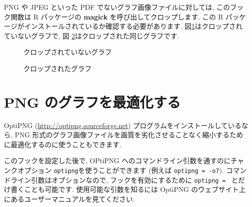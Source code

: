 \documentclass[
  11pt,
]{bxjsreport}
\newenvironment{Shaded}{\begin{snugshade}}{\end{snugshade}}
\newcommand{\AttributeTok}[1]{\textcolor[rgb]{0.77,0.63,0.00}{#1}}
\newcommand{\FunctionTok}[1]{\textcolor[rgb]{0.00,0.00,0.00}{#1}}
\newcommand{\NormalTok}[1]{#1}
\newcommand{\SpecialCharTok}[1]{\textcolor[rgb]{0.00,0.00,0.00}{#1}}
\begin{document}
PNG や JPEG といった PDF でないグラフ画像ファイルに対しては, このフック関数は R パッケージの \textbf{magick} \autocite{R-magick}を呼び出してクロップします. この R パッケージがインストールされているか確認する必要があります. 図\ref{fig:crop-no}はクロップされていないグラフで, 図 \ref{fig:crop-yes}はクロップされた同じグラフです.

\begin{figure}

{\centering {} 

}

\caption{クロップされていないグラフ}\label{fig:crop-no}
\end{figure}

\begin{figure}

{\centering {} 

}

\caption{クロップされたグラフ}\label{fig:crop-yes}
\end{figure}

\hypertarget{optipng}{%
\section{PNG のグラフを最適化する}\label{optipng}}

OptiPNG (\url{http://optipng.sourceforge.net}) プログラムをインストールしているなら, PNG 形式のグラフ画像ファイルを画質を劣化させることなく縮小するために最適化するのに使うこともできます.

\begin{Shaded}
\end{Shaded}

このフックを設定した後で, OPtiPNG へのコマンドライン引数を通すのにチャンクオプション \texttt{optipng}を使うことができます (例えば \texttt{optipng = \textquotesingle{}-o7\textquotesingle{}}). コマンドライン引数はオプションなので, フックを有効にするために \texttt{optipng = \textquotesingle{}\textquotesingle{}} とだけ書くことも可能です. 使用可能な引数を知るには OptiPNG のウェブサイト上にあるユーザーマニュアルを見てください.
\end{document}
